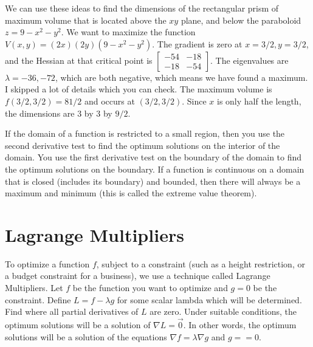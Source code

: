 \begin{example}
  We can use these ideas to find the dimensions of the rectangular
  prism of maximum volume that is located above the {$xy$} plane, and
  below the paraboloid {$z=9-x^2-y^2$}. We want to maximize the
  function $V(x,y) = (2x)(2y)(9-x^2-y^2)$.  The gradient is zero at
  $x=3/2,y=3/2$, and the Hessian at that critical point is
  $\begin{bmatrix}-54&-18 \\-18&-54\end{bmatrix}$. The eigenvalues are
  $\lambda = -36,-72$, which are both negative, which means we have
  found a maximum. I skipped a lot of details which you can check. The
  maximum volume is $f(3/2,3/2)=81/2$ and occurs at $(3/2,3/2)$. Since
  $x$ is only half the length, the dimensions are $3$ by $3$ by $9/2$.
\end{example}

If the domain of a function is restricted to a small region, then you
use the second derivative test to find the optimum solutions on the
interior of the domain.  You use the first derivative test on the
boundary of the domain to find the optimum solutions on the boundary.
If a function is continuous on a domain that is closed (includes its
boundary) and bounded, then there will always be a maximum and minimum
(this is called the extreme value theorem).


\section{Lagrange Multipliers}

To optimize a function {$f$}, subject to a constraint (such as a
height restriction, or a budget constraint for a business), we use a
technique called Lagrange Multipliers. Let {$f$} be the function you
want to optimize and {$g = 0$} be the constraint. Define $L=f-\lambda
g$ for some scalar lambda which will be determined. Find where all
partial derivatives of {$L$} are zero.  Under suitable conditions, the
optimum solutions will be a solution of $\nabla L=\vec 0$.  In other
words, the optimum solutions will be a solution of the equations
$\nabla f = \lambda \nabla g$ and $g==0$.

